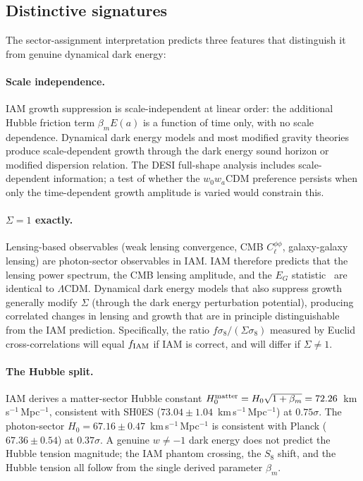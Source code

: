 \documentclass[12pt,a4paper]{article}
\newcommand{\lcdm}{$\Lambda$CDM}
\newcommand{\kms}{km\,s$^{-1}$\,Mpc$^{-1}$}
\begin{document}
\subsection{Distinctive signatures}
\label{sec:signatures}

The sector-assignment interpretation predicts three features that
distinguish it from genuine dynamical dark energy:

\paragraph{Scale independence.}
IAM growth suppression is scale-independent at linear order: the additional
Hubble friction term $\beta_m E(a)$ is a function of time only, with no
scale dependence.
Dynamical dark energy models and most modified gravity theories produce
scale-dependent growth through the dark energy sound horizon or modified
dispersion relation.
The DESI full-shape analysis includes scale-dependent information; a test
of whether the $w_0 w_a$CDM preference persists when only the
time-dependent growth amplitude is varied would constrain this.

\paragraph{$\Sigma = 1$ exactly.}
Lensing-based observables (weak lensing convergence, CMB $C_\ell^{\phi\phi}$,
galaxy-galaxy lensing) are photon-sector observables in IAM.
IAM therefore predicts that the lensing power spectrum, the CMB lensing
amplitude, and the $E_G$ statistic~\citep{Zhang2007EG} are identical to
\lcdm{}.
Dynamical dark energy models that also suppress growth generally modify
$\Sigma$ (through the dark energy perturbation potential), producing
correlated changes in lensing and growth that are in principle distinguishable
from the IAM prediction.
Specifically, the ratio $f\sigma_8 / (\Sigma \sigma_8)$ measured by
Euclid cross-correlations will equal $f_{\rm IAM}$ if IAM is correct,
and will differ if $\Sigma \neq 1$.

\paragraph{The Hubble split.}
IAM derives a matter-sector Hubble constant $H_0^{\rm matter} = H_0
\sqrt{1 + \beta_m} = 72.26$~\kms{}, consistent with SH0ES
($73.04 \pm 1.04$~\kms) at $0.75\sigma$.
The photon-sector $H_0 = 67.16 \pm 0.47$~\kms{} is consistent with
Planck ($67.36 \pm 0.54$) at $0.37\sigma$.
A genuine $w \neq -1$ dark energy does not predict the Hubble tension
magnitude; the IAM phantom crossing, the $S_8$ shift, and the
Hubble tension all follow from the single derived parameter $\beta_m$.
\end{document}
